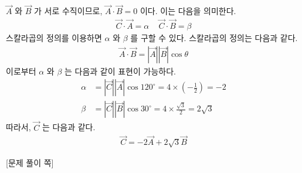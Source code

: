 \documentclass[APS,floatfix,nofootinbib,superscriptaddress,fleqn,preprint]{revtex4}
\begin{document}
 $\vec{A}$ 와 $\vec{B}$ 가 서로 수직이므로, $\vec{A} \cdot \vec{B} =0 $ 이다. 이는 다음을 의미한다.
\begin{align*}
  \vec{C} \cdot \vec{A} =\alpha\, \quad
  \vec{C} \cdot \vec{B} =\beta 
\end{align*}
스칼라곱의 정의를 이용하면 $\alpha$ 와 $\beta$ 를 구할 수 있다. 스칼라곱의 정의는 다음과 같다.
\begin{align*}
  \vec{A} \cdot \vec{B} = |\vec{A}||\vec{B}|\cos{\theta}
\end{align*}
이로부터 $\alpha$ 와 $\beta$ 는 다음과 같이 표현이 가능하다.
\begin{align*}
  \alpha &= |\vec{C}||\vec{A}|\cos{120^{\circ}} = 4 \times \left(-\frac{1}{2}\right) = -2 \\
  \beta &= |\vec{C}||\vec{B}|\cos{30^{\circ}} = 4 \times \frac{\sqrt{3}}{2} = 2\sqrt{3}
\end{align*}
따라서, $\vec{C}$ 는 다음과 같다.
\begin{align*}
  \vec{C} = -2 \vec{A} + 2\sqrt{3} \vec{B}
\end{align*}
\newpage

{\color{gray} [문제 풀이 쪽]}

\newpage 
\end{document}
